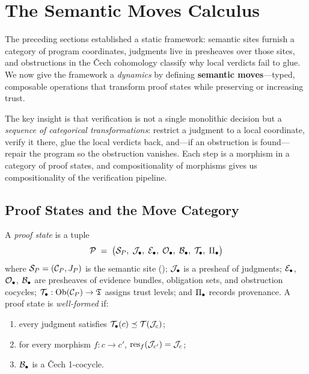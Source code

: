
\section{The Semantic Moves Calculus}\label{sec:moves}

The preceding sections established a static framework: semantic sites
furnish a category of program coordinates, judgments live in presheaves
over those sites, and obstructions in the \v{C}ech cohomology
classify why local verdicts fail to glue.  We now give the framework
a \emph{dynamics} by defining \textbf{semantic moves}---typed,
composable operations that transform proof states while preserving
or increasing trust.

The key insight is that verification is not a single monolithic
decision but a \emph{sequence of categorical transformations}: restrict
a judgment to a local coordinate, verify it there, glue the local
verdicts back, and---if an obstruction is found---repair the program
so the obstruction vanishes.  Each step is a morphism in a category of
proof states, and compositionality of morphisms gives us compositionality
of the verification pipeline.

\subsection{Proof States and the Move Category}\label{sec:move-category}

\begin{definition}\label{def:seminal-proof-state}
A \emph{proof state} is a tuple
\[
  \mathcal{P} \;=\; \bigl(\mathcal{S}_P,\; \mathcal{J}_\bullet,\;
    \mathcal{E}_\bullet,\; \mathcal{O}_\bullet,\; \mathcal{B}_\bullet,\;
    \mathcal{T}_\bullet,\; \Pi_\bullet\bigr)
\]
where $\mathcal{S}_P = (\mathcal{C}_P, J_P)$ is the semantic site
(); $\mathcal{J}_\bullet$ is a presheaf of judgments;
$\mathcal{E}_\bullet$, $\mathcal{O}_\bullet$, $\mathcal{B}_\bullet$ are presheaves of
evidence bundles, obligation sets, and obstruction cocycles;
$\mathcal{T}_\bullet : \mathrm{Ob}(\mathcal{C}_P) \to \mathfrak{T}$ assigns trust levels;
and $\Pi_\bullet$ records provenance.  A proof state is
\emph{well-formed} if:
\begin{enumerate}[label=\textnormal{(WF\arabic*)},nosep]
  \item every judgment satisfies
        $\mathcal{T}_\bullet(c) \preceq \mathcal{T}(\mathcal{J}_c)$;
  \item for every morphism $f : c \to c'$,
        $\mathrm{res}_f(\mathcal{J}_{c'}) = \mathcal{J}_c$;
  \item $\mathcal{B}_\bullet$ is a \v{C}ech 1-cocycle.
\end{enumerate}
\end{definition}

